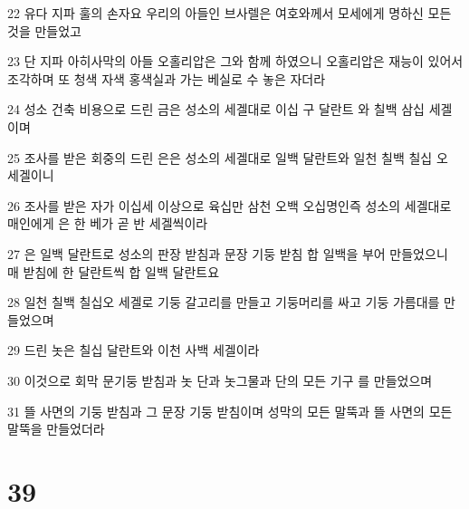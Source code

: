 \par 22 유다 지파 훌의 손자요 우리의 아들인 브사렐은 여호와께서 모세에게 명하신 모든 것을 만들었고
\par 23 단 지파 아히사막의 아들 오홀리압은 그와 함께 하였으니 오홀리압은 재능이 있어서 조각하며 또 청색 자색 홍색실과 가는 베실로 수 놓은 자더라
\par 24 성소 건축 비용으로 드린 금은 성소의 세겔대로 이십 구 달란트 와 칠백 삼십 세겔이며
\par 25 조사를 받은 회중의 드린 은은 성소의 세겔대로 일백 달란트와 일천 칠백 칠십 오 세겔이니
\par 26 조사를 받은 자가 이십세 이상으로 육십만 삼천 오백 오십명인즉 성소의 세겔대로 매인에게 은 한 베가 곧 반 세겔씩이라
\par 27 은 일백 달란트로 성소의 판장 받침과 문장 기둥 받침 합 일백을 부어 만들었으니 매 받침에 한 달란트씩 합 일백 달란트요
\par 28 일천 칠백 칠십오 세겔로 기둥 갈고리를 만들고 기둥머리를 싸고 기둥 가름대를 만들었으며
\par 29 드린 놋은 칠십 달란트와 이천 사백 세겔이라
\par 30 이것으로 회막 문기둥 받침과 놋 단과 놋그물과 단의 모든 기구 를 만들었으며
\par 31 뜰 사면의 기둥 받침과 그 문장 기둥 받침이며 성막의 모든 말뚝과 뜰 사면의 모든 말뚝을 만들었더라

\chapter{39}

